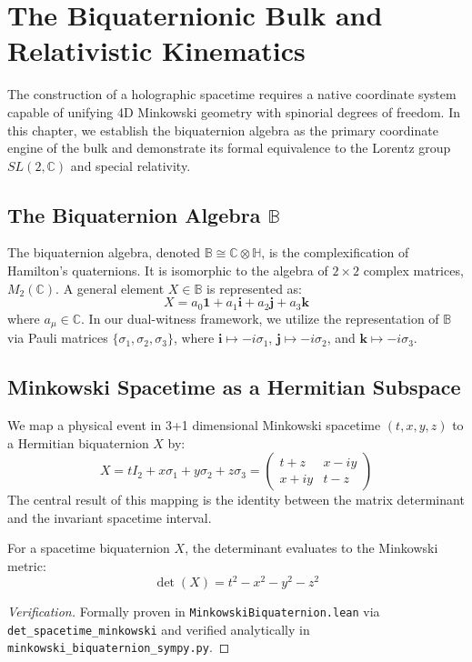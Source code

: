 \chapter{The Biquaternionic Bulk and Relativistic Kinematics}

The construction of a holographic spacetime requires a native coordinate system capable of unifying 4D Minkowski geometry with spinorial degrees of freedom. In this chapter, we establish the biquaternion algebra as the primary coordinate engine of the bulk and demonstrate its formal equivalence to the Lorentz group $SL(2, \mathbb{C})$ and special relativity.

\section{The Biquaternion Algebra $\mathbb{B}$}
The biquaternion algebra, denoted $\mathbb{B} \cong \mathbb{C} \otimes \mathbb{H}$, is the complexification of Hamilton's quaternions. It is isomorphic to the algebra of $2 \times 2$ complex matrices, $M_2(\mathbb{C})$. A general element $X \in \mathbb{B}$ is represented as:
\begin{equation}
    X = a_0 \mathbf{1} + a_1 \mathbf{i} + a_2 \mathbf{j} + a_3 \mathbf{k}
\end{equation}
where $a_\mu \in \mathbb{C}$. In our dual-witness framework, we utilize the representation of $\mathbb{B}$ via Pauli matrices $\{\sigma_1, \sigma_2, \sigma_3\}$, where $\mathbf{i} \mapsto -i\sigma_1$, $\mathbf{j} \mapsto -i\sigma_2$, and $\mathbf{k} \mapsto -i\sigma_3$.

\section{Minkowski Spacetime as a Hermitian Subspace}
We map a physical event in 3+1 dimensional Minkowski spacetime $(t, x, y, z)$ to a Hermitian biquaternion $X$ by:
\begin{equation}
    X = t I_2 + x \sigma_1 + y \sigma_2 + z \sigma_3 = 
    \begin{pmatrix} 
    t + z & x - iy \\ 
    x + iy & t - z 
    \end{pmatrix}
\end{equation}
The central result of this mapping is the identity between the matrix determinant and the invariant spacetime interval.
\begin{theorem}
For a spacetime biquaternion $X$, the determinant evaluates to the Minkowski metric:
\begin{equation}
    \det(X) = t^2 - x^2 - y^2 - z^2
\end{equation}
\end{theorem}
\begin{proof}[Verification]
Formally proven in \texttt{MinkowskiBiquaternion.lean} via \texttt{det\_spacetime\_minkowski} and verified analytically in \texttt{minkowski\_biquaternion\_sympy.py}.
\end{proof}

